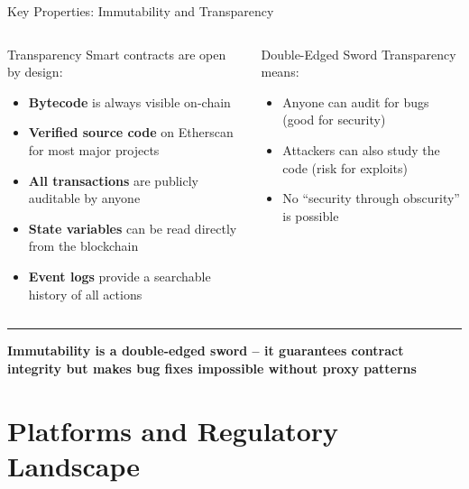 \documentclass[8pt,aspectratio=169]{beamer}
\newcommand{\bottomnote}[1]{\vfill\vspace{-2mm}\textcolor{mllavender2}{\rule{\textwidth}{0.4pt}}\vspace{1mm}\footnotesize\textbf{#1}}
\begin{document}
\begin{frame}{Key Properties: Immutability and Transparency}
\begin{columns}[T]
\begin{block}{\textcolor{mlorange}{Transparency}}
\footnotesize
Smart contracts are open by design:
\begin{itemize}
  \item \textbf{Bytecode} is always visible on-chain
  \item \textbf{Verified source code} on Etherscan for most major projects
  \item \textbf{All transactions} are publicly auditable by anyone
  \item \textbf{State variables} can be read directly from the blockchain
  \item \textbf{Event logs} provide a searchable history of all actions
\end{itemize}
\end{block}
\vspace{2mm}
\begin{exampleblock}{Double-Edged Sword}
\footnotesize
Transparency means:
\begin{itemize}
  \item Anyone can audit for bugs (good for security)
  \item Attackers can also study the code (risk for exploits)
  \item No ``security through obscurity'' is possible
\end{itemize}
\end{exampleblock}
\end{columns}
\bottomnote{Immutability is a double-edged sword -- it guarantees contract integrity but makes bug fixes impossible without proxy patterns}
\end{frame}

\section{Platforms and Regulatory Landscape}
\end{document}
